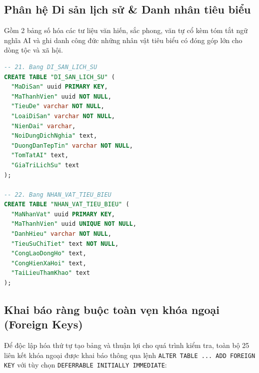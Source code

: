 \subsection{Phân hệ Di sản lịch sử \& Danh nhân tiêu biểu}

Gồm 2 bảng số hóa các tư liệu văn hiến, sắc phong, văn tự cổ kèm tóm tắt ngữ nghĩa AI và ghi danh công đức những nhân vật tiêu biểu có đóng góp lớn cho dòng tộc và xã hội.

\begin{lstlisting}[language=SQL, caption={Kịch bản DDL - Phân hệ Di sản số và Danh nhân tiêu biểu}, label={lst:ddl_heritage}]
-- 21. Bang DI_SAN_LICH_SU
CREATE TABLE "DI_SAN_LICH_SU" (
  "MaDiSan" uuid PRIMARY KEY,
  "MaThanhVien" uuid NOT NULL,
  "TieuDe" varchar NOT NULL,
  "LoaiDiSan" varchar NOT NULL,
  "NienDai" varchar,
  "NoiDungDichNghia" text,
  "DuongDanTepTin" varchar NOT NULL,
  "TomTatAI" text,
  "GiaTriLichSu" text
);

-- 22. Bang NHAN_VAT_TIEU_BIEU
CREATE TABLE "NHAN_VAT_TIEU_BIEU" (
  "MaNhanVat" uuid PRIMARY KEY,
  "MaThanhVien" uuid UNIQUE NOT NULL,
  "DanhHieu" varchar NOT NULL,
  "TieuSuChiTiet" text NOT NULL,
  "CongLaoDongHo" text,
  "CongHienXaHoi" text,
  "TaiLieuThamKhao" text
);
\end{lstlisting}

\subsection{Khai báo ràng buộc toàn vẹn khóa ngoại (Foreign Keys)}

Để độc lập hóa thứ tự tạo bảng và thuận lợi cho quá trình kiểm tra, toàn bộ 25 liên kết khóa ngoại được khai báo thông qua lệnh \texttt{ALTER TABLE ... ADD FOREIGN KEY} với tùy chọn \texttt{DEFERRABLE INITIALLY IMMEDIATE}:

